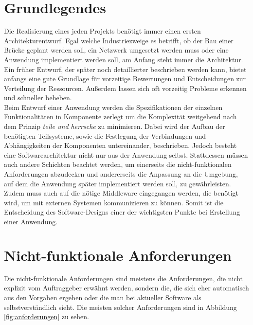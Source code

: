 \section{Grundlegendes}
Die Realisierung eines jeden Projekts benötigt immer einen ersten Architekturentwurf. Egal welche Industriezweige es betrifft, ob der Bau einer Brücke geplant werden soll, ein Netzwerk umgesetzt werden muss oder eine Anwendung implementiert werden soll, am Anfang steht immer die Architektur. Ein früher Entwurf, der später noch detaillierter beschrieben werden kann, bietet anfangs eine gute Grundlage für vorzeitige Bewertungen und Entscheidungen zur Verteilung der Ressourcen. Außerdem lassen sich oft vorzeitig Probleme erkennen und schneller beheben.
\\
\linebreak
Beim Entwurf einer Anwendung werden die Spezifikationen der einzelnen Funktionalitäten in Komponente zerlegt um die Komplexität weitgehend nach dem Prinzip \textit{teile und herrsche} zu minimieren. Dabei wird der Aufbau der benötigten Teilsysteme, sowie die Festlegung der Verbindungen und Abhängigkeiten der Komponenten untereinander, beschrieben. Jedoch besteht eine Softwarearchitektur nicht nur aus der Anwendung selbst. Stattdessen müssen auch andere Schichten beachtet werden, um einerseits die nicht-funktionalen Anforderungen abzudecken und andererseits die Anpassung an die Umgebung, auf dem die Anwendung später implementiert werden soll, zu gewährleisten. Zudem muss auch auf die nötige Middleware eingegangen werden, die benötigt wird, um mit externen Systemen kommunizieren zu können. Somit ist die Entscheidung des Software-Designs einer der wichtigsten Punkte bei Erstellung einer Anwendung\autocites[Vgl.][]{onlinelexikonsa}[Vgl.][1]{gmodse}.

\section{Nicht-funktionale Anforderungen}
\label{sec:nfa}
Die nicht-funktionale Anforderungen sind meistens die Anforderungen, die nicht explizit vom Auftraggeber erwähnt werden, sondern die, die sich eher automatisch aus den Vorgaben ergeben oder die man bei aktueller Software als selbstverständlich sieht. Die meisten solcher Anforderungen sind in Abbildung \ref{fig:anforderungen} zu sehen.

